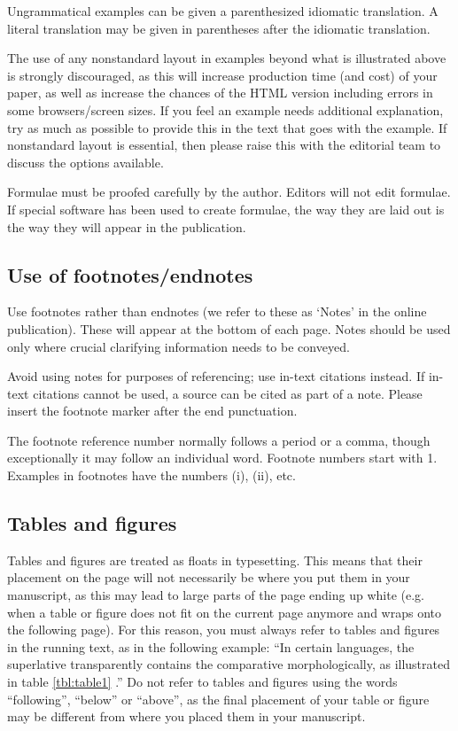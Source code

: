 \documentclass[charis,linguex,biblatex]{glossa}
\begin{document}
Ungrammatical examples can be given a parenthesized idiomatic translation. A literal translation may be given in parentheses after the idiomatic translation.

The use of any nonstandard layout in examples beyond what is illustrated above is strongly discouraged, as this will increase production time (and cost) of your paper, as well as increase the chances of the HTML version including errors in some browsers/screen sizes. If you feel an example needs additional explanation, try as much as possible to provide this in the text that goes with the example. If nonstandard layout is essential, then please raise this with the editorial team to discuss the options available.

Formulae must be proofed carefully by the author. Editors will not edit formulae. If special software has been used to create formulae, the way they are laid out is the way they will appear in the publication.

\subsection{Use of footnotes/endnotes}\label{fn}

Use footnotes rather than endnotes (we refer to these as ‘Notes’ in the online publication). These will appear at the bottom of each page. Notes should be used only where crucial clarifying information needs to be conveyed. 

Avoid using notes for purposes of referencing; use in-text citations instead. If in-text citations cannot be used, a source can be cited as part of a note. Please insert the footnote marker after the end punctuation.

The footnote reference number normally follows a period or a comma, though exceptionally it may follow an individual word. Footnote numbers start with 1. Examples in footnotes have the numbers (i), (ii), etc.

\subsection{Tables and figures}

Tables and figures are treated as floats in typesetting. This means that their placement on the page will not necessarily be where you put them in your manuscript, as this may lead to large parts of the page ending up white (e.g. when a table or figure does not fit on the current page anymore and wraps onto the following page). For this reason, you must always refer to tables and figures in the running text, as in the following example: ``In certain languages, the superlative transparently contains the comparative morphologically, as illustrated in table \ref{tbl:table1} \citep[46]{Bobaljik2012}.'' Do not refer to tables and figures using the words ``following'', ``below'' or ``above'', as the final placement of your table or figure may be different from where you placed them in your manuscript.
\end{document}
